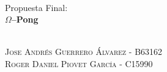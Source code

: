 \begin{titlepage}

\HRule \\[0.2cm]
{ \large Propuesta Final: \\[0.5cm] 
\Large \bfseries $\Omega$--Pong}\\[0.4cm]
\HRule \\[2cm]
 

\begin{minipage}{0.6\textwidth}
\begin{center}
\textsc{Jose Andrés Guerrero Álvarez - B63162}\\
\textsc{Roger Daniel Piovet García - C15990}\\

\end{center}
\end{minipage}\\[2cm]



\vfill %

\end{titlepage}

\newpage
